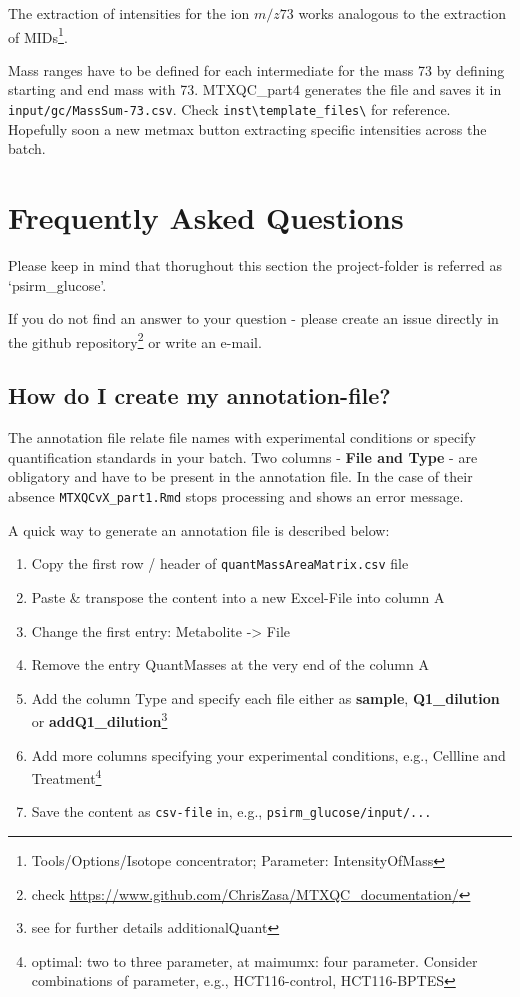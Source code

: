 \documentclass[]{book}
\providecommand{\tightlist}{%
  \setlength{\itemsep}{0pt}\setlength{\parskip}{0pt}}
\let\rmarkdownfootnote\footnote%
\def\footnote{\protect\rmarkdownfootnote}
\theoremstyle{definition}
\theoremstyle{definition}
\theoremstyle{definition}
\theoremstyle{remark}
\begin{document}
The extraction of intensities for the ion \(m/z 73\) works analogous to
the extraction of MIDs\footnote{Tools/Options/Isotope concentrator;
  Parameter: IntensityOfMass}.

Mass ranges have to be defined for each intermediate for the mass 73 by
defining starting and end mass with 73. MTXQC\_part4 generates the file
and saves it in \texttt{input/gc/MassSum-73.csv}. Check
\texttt{inst\textbackslash{}template\_files\textbackslash{}} for
reference. Hopefully soon a new metmax button extracting specific
intensities across the batch.

\chapter{Frequently Asked Questions}\label{FAQ}

Please keep in mind that thorughout this section the project-folder is
referred as `psirm\_glucose'.

If you do not find an answer to your question - please create an issue
directly in the github repository\footnote{check
  \url{https://www.github.com/ChrisZasa/MTXQC_documentation/}} or write
an e-mail.

\section{How do I create my annotation-file?}\label{createannotation}

The annotation file relate file names with experimental conditions or
specify quantification standards in your batch. Two columns -
\textbf{File and Type} - are obligatory and have to be present in the
annotation file. In the case of their absence
\texttt{MTXQCvX\_part1.Rmd} stops processing and shows an error message.

A quick way to generate an annotation file is described below:

\begin{enumerate}
\def\labelenumi{\arabic{enumi}.}
\tightlist
\item
  Copy the first row / header of \texttt{quantMassAreaMatrix.csv} file
\item
  Paste \& transpose the content into a new Excel-File into column A
\item
  Change the first entry: Metabolite -\textgreater{} File
\item
  Remove the entry QuantMasses at the very end of the column A
\item
  Add the column Type and specify each file either as \textbf{sample},
  \textbf{Q1\_dilution} or \textbf{addQ1\_dilution}\footnote{see for
    further details additionalQuant}
\item
  Add more columns specifying your experimental conditions, e.g.,
  Cellline and Treatment\footnote{optimal: two to three parameter, at
    maimumx: four parameter. Consider combinations of parameter, e.g.,
    HCT116-control, HCT116-BPTES}
\item
  Save the content as \texttt{csv-file} in, e.g.,
  \texttt{psirm\_glucose/input/...}
\end{enumerate}
\end{document}
